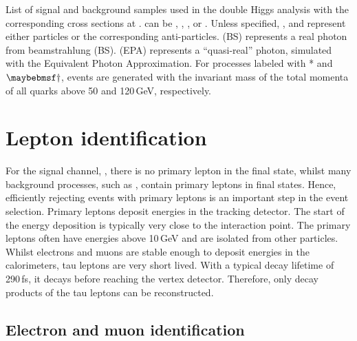 \begin{table}[!tbp]
\caption[Signal and background samples with the corresponding cross sections at .]
{List of signal and background samples used in the double Higgs analysis with the corresponding cross sections at . \Pquark can be \Pup, \Pdown, \Pstrange, \Pbottom or \Ptop. Unless specified, \Pquark, \Plepton and \Pnu represent either particles or the corresponding anti-particles. \Pphoton(BS) represents a real photon from beamstrahlung (BS). \Pphoton(EPA) represents a ``quasi-real'' photon, simulated with the Equivalent Photon Approximation. For processes labeled with * and $\myDagger$, events are generated with the invariant mass of the total momenta of all quarks above 50 and 120\,GeV, respectively.}
\label{tab:doubleHiggsMCSamples}
\end{table}

\section{Lepton identification}
\label{sec:doubleHiggsLepton}

For the signal channel, \eeToHHbbWWHad, there is no primary lepton in the final state, whilst many background  processes, such as \HepProcess{\Pquark \Pquark \Pquark \Pquark \Plepton \Pnu}, contain primary leptons in final states. Hence, efficiently rejecting events with primary leptons is an important step in the event selection. Primary leptons deposit energies in the tracking detector. The start of the energy deposition is typically very close to the interaction point. The primary leptons often have energies above 10\,GeV and are  isolated from other particles. Whilst electrons and muons are stable enough to deposit energies in the calorimeters, tau leptons are very short lived. With a typical decay lifetime of 290\,fs\cite{Abreu:1991jn}, it decays before reaching the vertex detector. Therefore, only decay products of the tau leptons can be reconstructed.





\subsection{Electron and muon identification}
\label{sec:doubleHiggsLeptonID}

